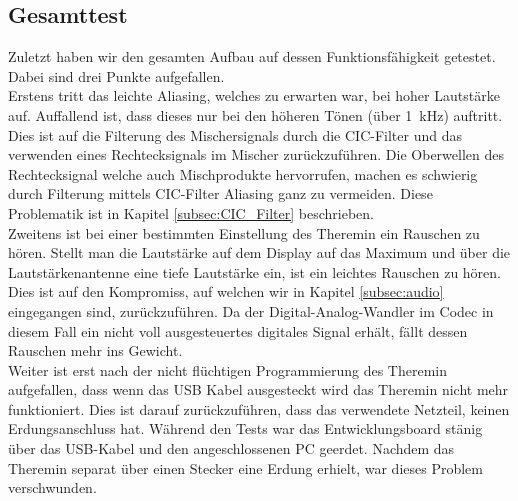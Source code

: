 \subsection{Gesamttest}\label{subsec:Gesammttest}
Zuletzt haben wir den gesamten Aufbau auf dessen Funktionsfähigkeit getestet. Dabei sind drei Punkte aufgefallen.\\
Erstens tritt das leichte Aliasing, welches zu erwarten war, bei hoher Lautstärke auf. Auffallend ist, dass dieses nur bei den höheren Tönen (über \SI{1}{kHz}) auftritt. Dies ist auf die Filterung des Mischersignals durch die CIC-Filter und das verwenden eines Rechtecksignals im Mischer zurückzuführen. Die Oberwellen des Rechtecksignal welche auch Mischprodukte hervorrufen, machen es schwierig durch Filterung mittels CIC-Filter Aliasing ganz zu vermeiden. Diese Problematik ist in Kapitel \ref{subsec:CIC_Filter} beschrieben.\\
Zweitens ist bei einer bestimmten Einstellung des Theremin ein Rauschen zu hören. Stellt man die Lautstärke auf dem Display auf das Maximum und über die Lautstärkenantenne eine tiefe Lautstärke ein, ist ein leichtes Rauschen zu hören. Dies ist auf den Kompromiss, auf welchen wir in Kapitel \ref{subsec:audio} eingegangen sind, zurückzuführen. Da der Digital-Analog-Wandler im Codec in diesem Fall ein nicht voll ausgesteuertes digitales Signal erhält, fällt dessen Rauschen mehr ins Gewicht.\\
Weiter ist erst nach der nicht flüchtigen Programmierung des Theremin aufgefallen, dass wenn das USB Kabel ausgesteckt wird das Theremin nicht mehr funktioniert. Dies ist darauf zurückzuführen, dass das verwendete Netzteil, keinen Erdungsanschluss hat. Während den Tests war das Entwicklungsboard stänig über das USB-Kabel und den angeschlossenen PC geerdet. Nachdem das Theremin separat über einen Stecker eine Erdung erhielt, war dieses Problem verschwunden.


